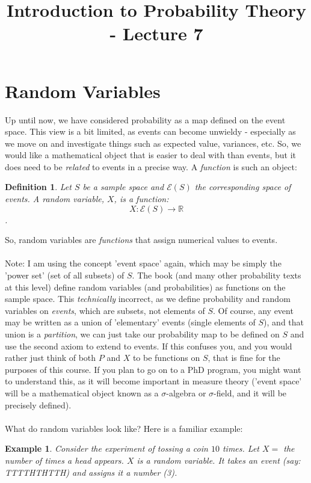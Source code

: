 \documentclass[12pt]{article} %
\date{}
\title{Introduction to Probability Theory - Lecture 7}
\newtheorem{defn}{Definition}
\newtheorem{example}{Example}
\begin{document}
\maketitle
\section{Random Variables}
Up until now, we have considered probability as a map defined on the event space. This view is a bit limited, as events can become unwieldy - especially as we move on and investigate things such as expected value, variances, etc. So, we would like a mathematical object that is easier to deal with than events, but it does need to be \emph{related} to events in a precise way. A \emph{function} is such an object:
\begin{defn}
Let $S$ be a sample space and $\mathcal{E}(S)$ the corresponding space of events.  A \emph{random variable}, $X$, is a function:
$$X:\mathcal{E}(S)\rightarrow \mathbb{R}$$.
\end{defn}
So, random variables are \emph{functions} that assign numerical values to events.\\\\
Note: I am using the concept 'event space' again, which may be simply the 'power set' (set of all subsets) of $S$. The book (and many other probability texts at this level) define random variables (and probabilities) as functions on the sample space. This \emph{technically} incorrect, as we define probability and random variables on \emph{events}, which are subsets, not elements of $S$. Of course, any event may be written as a union of 'elementary' events (single elements of $S$), and that union is a \emph{partition}, we can just take our probability map to be defined on $S$ and use the second axiom to extend to events. If this confuses you, and you would rather just think of both $P$ and $X$ to be functions on $S$, that is fine for the purposes of this course. If you plan to go on to a PhD program, you might want to understand this, as it will become important in measure theory ('event space' will be a mathematical object known as a $\sigma$-algebra or $\sigma$-field, and it will be precisely defined).\\\\

What do random variables look like? Here is a familiar example:

\begin{example}
Consider the experiment of tossing a coin $10$ times. Let $X =$ the number of times a head appears. $X$ is a random variable. It takes an event (say: TTTTHTHTTH) and assigns it a number (3).
\end{example}
\end{document}
